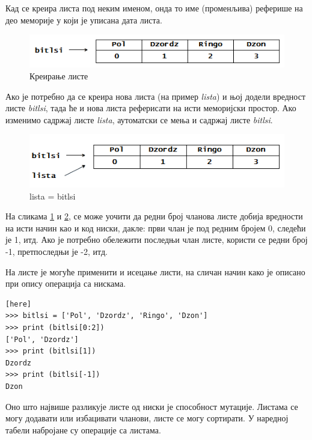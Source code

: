Кад се креира листа под неким именом, онда то име (променљива) реферише на део меморије у који је уписана дата листа.

\begin{figure}[here]
\centering
\includegraphics[scale = 0.50]{bitlsi1.png}
\caption{Креирање листе}
\label{slike:lista}
\end{figure}

Ако је потребно да се креира нова листа (на пример \emph{lista}) и њој додели вредност листе \emph{bitlsi}, тада ће и нова листа реферисати на исти меморијски простор. Ако изменимо садржај листе \emph{lista}, аутоматски се мења и садржај листе \emph{bitlsi}.

\begin{figure}[here]
\centering
\includegraphics[scale=0.50]{bitlsi2.png}
\caption{lista = bitlsi }
\label{slike:kopiranje}
\end{figure}

На сликама \ref{slike:lista} и \ref{slike:kopiranje}, се може уочити да редни број чланова листе добија вредности на исти начин као и код ниски, дакле: први члан је под редним бројем 0, следећи је 1, итд. Ако је потребно обележити последњи члан листе, користи се редни број -1, претпоследњи је -2, итд.

На листе је могуће применити и исецање листи, на сличан начин како је описано при опису операција са нискама.

\begin{lstlisting}[caption = Исецање листи, label = list_slice][here]
>>> bitlsi = ['Pol', 'Dzordz', 'Ringo', 'Dzon']
>>> print (bitlsi[0:2])
['Pol', 'Dzordz']
>>> print (bitlsi[1])
Dzordz
>>> print (bitlsi[-1])
Dzon
\end{lstlisting}

Оно што највише разликује листе од ниски је способност мутације. Листама се могу додавати или избацивати чланови, листе се могу сортирати. У наредној табели набројане су операције са листама.

